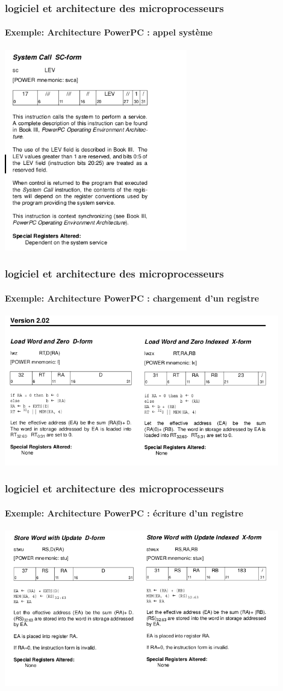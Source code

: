 \documentclass[xcolor=svgnames,final,smaller,a4]{beamer}
\begin{document}
\begin{frame}
  \frametitle{logiciel et architecture des microprocesseurs}
  \framesubtitle{Exemple: Architecture PowerPC : appel système}
  \includegraphics[width=0.60\textwidth]{powerpc-syscall-instr}
\end{frame}

\begin{frame}
  \frametitle{logiciel et architecture des microprocesseurs}
  \framesubtitle{Exemple: Architecture PowerPC : chargement d'un registre}
  \includegraphics[width=0.9\textwidth]{powerpc-load-instr}
  

\end{frame}

\begin{frame}
  \frametitle{logiciel et architecture des microprocesseurs}
  \framesubtitle{Exemple: Architecture PowerPC : écriture d'un registre}
  \includegraphics[width=0.9\textwidth]{powerpc-store-instr}
  

\end{frame}
\end{document}

